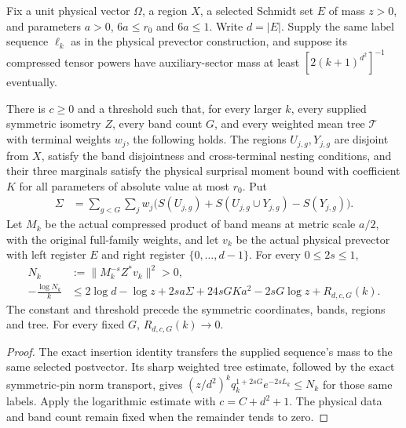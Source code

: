 \begin{theorem}
    \label{thm:supplied_schmidt_bell_sharp_rate}
    \leanok
    Fix a unit physical vector $\Omega$, a region $X$, a selected Schmidt
    set $E$ of mass $z>0$, and parameters $a>0$, $6a\le r_0$ and $6a\le1$.
    Write $d=|E|$. Supply the same label sequence $\ell_k$ as in the physical
    prevector construction, and suppose its compressed tensor powers have
    auxiliary-sector mass at least $[2(k+1)^{d^2}]^{-1}$ eventually.

    There is $c\ge0$ and a threshold such that, for every larger $k$, every
    supplied symmetric isometry $Z$, every band count $G$, and every weighted
    mean tree $\mathcal T$ with terminal weights $w_j$, the following holds.
    The regions $U_{j,g},Y_{j,g}$ are disjoint from $X$, satisfy the band
    disjointness and cross-terminal nesting conditions, and their three
    marginals satisfy the physical surprisal moment bound with coefficient
    $K$ for all parameters of absolute value at most $r_0$. Put
    \begin{align*}
        \Sigma
        &=\sum_{g<G}\sum_jw_j
          \bigl(S(U_{j,g})+S(U_{j,g}\cup Y_{j,g})-S(Y_{j,g})\bigr).
    \end{align*}
    Let $M_k$ be the actual compressed product of band means at metric scale
    $a/2$, with the original full-family weights, and let $v_k$ be the actual
    physical prevector with left register $E$ and right register
    $\{0,\ldots,d-1\}$. For every $0\le2s\le1$,
    \begin{align*}
        N_k&:=\|M_k^{-s}Z^*v_k\|^2>0,\\
        -\frac{\log N_k}{k}
        &\le 2\log d-\log z+2sa\Sigma+24sGKa^2-2sG\log z
          +R_{d,c,G}(k).
    \end{align*}
    The constant and threshold precede the symmetric coordinates, bands,
    regions and tree. For every fixed $G$, $R_{d,c,G}(k)\to0$.
\end{theorem}
\begin{proof}
    \leanok
    The exact insertion identity transfers the supplied sequence's mass to
    the same selected postvector. Its sharp weighted tree estimate, followed
    by the exact symmetric-pin norm transport, gives
    $(z/d^2)^kq_k^{1+2sG}e^{-2sL_k}\le N_k$ for those same labels.
    Apply the logarithmic estimate with $c=C+d^2+1$. The physical data and
    band count remain fixed when the remainder tends to zero.
\end{proof}

